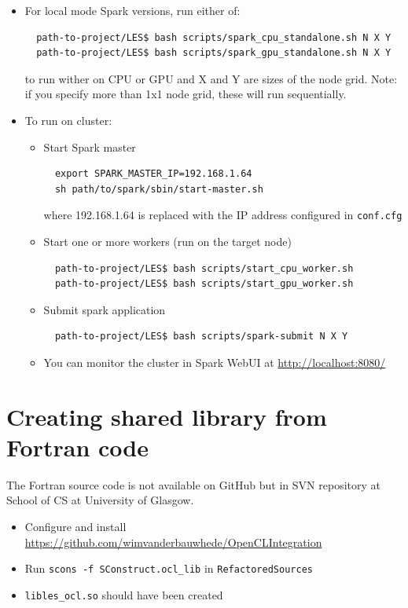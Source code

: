 \documentclass{l4proj}
\begin{document}
\begin{appendices}
\begin{itemize}
\item For local mode Spark versions, run either of:
\begin{verbatim}
  path-to-project/LES$ bash scripts/spark_cpu_standalone.sh N X Y
  path-to-project/LES$ bash scripts/spark_gpu_standalone.sh N X Y
\end{verbatim}
to run wither on CPU or GPU and X and Y are sizes of the node grid. 
Note: if you specify more than 1x1 node grid, these will run sequentially.

\item To run on cluster:
  \begin{itemize}
  \item Start Spark master
  \begin{verbatim}
  export SPARK_MASTER_IP=192.168.1.64
  sh path/to/spark/sbin/start-master.sh
  \end{verbatim}
  where 192.168.1.64 is replaced with the IP address configured in \texttt{conf.cfg}
  \item Start one or more workers (run on the target node)
  \begin{verbatim}
  path-to-project/LES$ bash scripts/start_cpu_worker.sh
  path-to-project/LES$ bash scripts/start_gpu_worker.sh
  \end{verbatim}
  \item Submit spark application
  \begin{verbatim}
  path-to-project/LES$ bash scripts/spark-submit N X Y
  \end{verbatim}
  \item You can monitor the cluster in Spark WebUI at \url{http://localhost:8080/}
  \end{itemize}

\end{itemize}

\section{Creating shared library from Fortran code}

The Fortran source code is not available on GitHub but in SVN repository at School of CS at University of Glasgow.

\begin{itemize}
\item Configure and install \url{https://github.com/wimvanderbauwhede/OpenCLIntegration}
\item Run \texttt{scons -f SConstruct.ocl\_lib} in \texttt{RefactoredSources}
\item \texttt{libles\_ocl.so} should have been created
\end{itemize}

\end{appendices}
\end{document}
